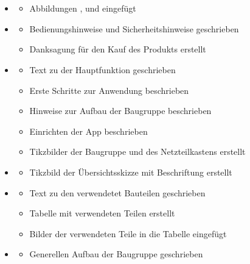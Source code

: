 \section{}
\begin{itemize}
	\item {}
	    \begin{itemize}
		\item Abbildungen ,  und  eingefügt
    	\end{itemize}
	\item {}
    	\begin{itemize}
		\item Bedienungshinweise und Sicherheitshinweise geschrieben
		\item Danksagung für den Kauf des Produkts erstellt
    	\end{itemize}
	\item {}
    	\begin{itemize}
		\item Text zu der Hauptfunktion geschrieben
		\item Erste Schritte zur Anwendung beschrieben
		\item Hinweise zur Aufbau der Baugruppe beschrieben
		\item Einrichten der App beschrieben
		\item Tikzbilder der Baugruppe und des Netzteilkastens erstellt
    	\end{itemize}
	\item {}
    	\begin{itemize}
		\item Tikzbild der Übersichtsskizze mit Beschriftung erstellt
    	\end{itemize}
	\item {}
    	\begin{itemize}
		\item Text zu den verwendetet Bauteilen geschrieben
		\item Tabelle mit verwendeten Teilen erstellt
		\item Bilder der verwendeten Teile in die Tabelle eingefügt
    	\end{itemize}
	\item {}
	    \begin{itemize}
		\item Generellen Aufbau der Baugruppe geschrieben

\end{itemize}
\end{itemize}
